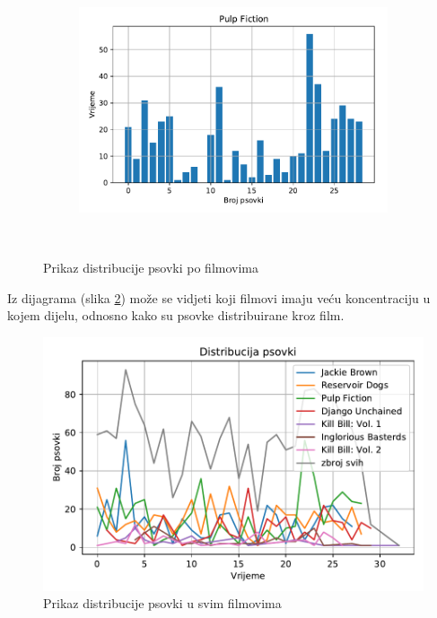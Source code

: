 \documentclass[11pt]{foi}
\begin{document}
\begin{figure}[h]
\begin{subfigure}[t]{0.5\textwidth}
    \end{subfigure}\\
    \begin{subfigure}[t]{0.5\textwidth}
        \centering
        \includegraphics{slike/pf.pdf}
    \end{subfigure}\\
    \caption{Prikaz distribucije psovki po filmovima}
	\label{distribucija}
\end{figure}

Iz dijagrama (slika \ref{distribucija_psovki}) može se vidjeti koji filmovi
imaju veću koncentraciju u kojem dijelu, odnosno kako su psovke distribuirane
kroz film.

\begin{figure}[h]
	\centering
	\includegraphics{"slike/filmovi_distribucija_psovki.pdf"}
	\caption{Prikaz distribucije psovki u svim filmovima}
	\label{distribucija_psovki}
\end{figure}
\end{document}
